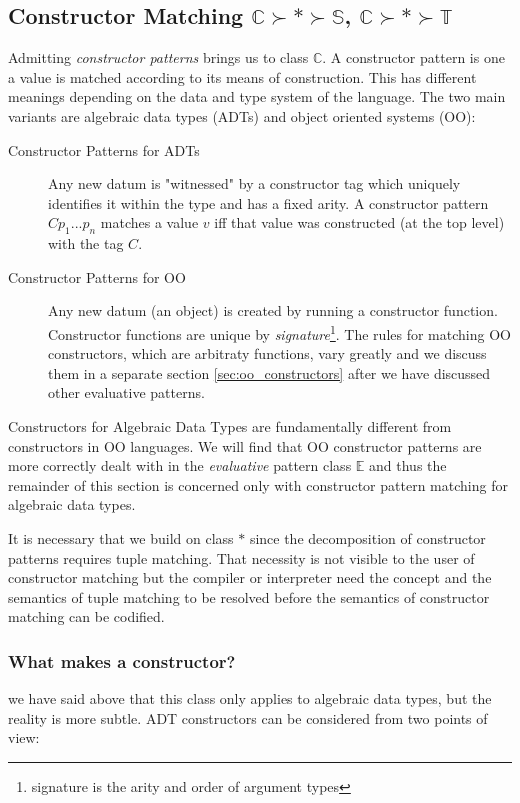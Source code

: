 \documentclass[acmsmall]{acmart}
\begin{document}
\subsection{Constructor Matching $\mathbb{C} \succ \mathbb{*} \succ \mathbb{S}$, $\mathbb{C} \succ \mathbb{*} \succ \mathbb{T}$}
Admitting \emph{constructor patterns} brings us to class $\mathbb{C}$.  A constructor pattern is one a value is matched according to its means of construction.  This has different meanings depending on the data and type system of the language.  The two main variants are algebraic data types (ADTs) and object oriented systems (OO):
\begin{description}
    \item[Constructor Patterns for ADTs] Any new datum is "witnessed" by a constructor tag which uniquely identifies it within the type and has a fixed arity.  A constructor pattern $C p_1 ... p_n$ matches a value $v$ iff that value was constructed (at the top level) with the tag $C$.
    \item[Constructor Patterns for OO] Any new datum (an object) is created by running a constructor function.  Constructor functions are unique by \emph{signature}\footnote{signature is the arity and order of argument types}.  The rules for matching OO constructors, which are arbitraty functions, vary greatly and we discuss them in a separate section \ref{sec:oo_constructors} after we have discussed other evaluative patterns.
\end{description}

Constructors for Algebraic Data Types are fundamentally different from constructors in OO languages.  We will find that OO constructor patterns are more correctly dealt with in the \emph{evaluative} pattern class $\mathbb{E}$ and thus the remainder of this section is concerned only with constructor pattern matching for algebraic data types.

It is necessary that we build on class $\mathbb{*}$ since the decomposition of constructor patterns requires tuple matching.  That necessity is not visible to the user of constructor matching but the compiler or interpreter need the concept and the semantics of tuple matching to be resolved before the semantics of constructor matching can be codified.

\subsubsection{What makes a constructor?}
we have said above that this class only applies to algebraic data types, but the reality is more subtle.  ADT constructors can be considered from two points of view:
\end{document}
